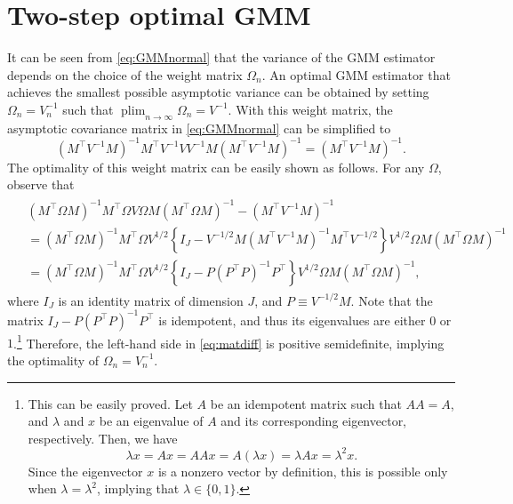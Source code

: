\documentclass[10.5pt, A4paper, openany, uplatex]{book}
\DeclareMathOperator*{\plim}{plim}
\numberwithin{equation}{section}
\begin{document}
\section{Two-step optimal GMM}
It can be seen from \eqref{eq:GMMnormal} that the variance of the GMM estimator depends on the choice of the weight matrix $\Omega_n$.
An optimal GMM estimator that achieves the smallest possible asymptotic variance can be obtained by setting $\Omega_n = V_n^{-1}$ such that $\plim_{n \to \infty} \Omega_n = V^{-1}$.
With this weight matrix, the asymptotic covariance matrix in \eqref{eq:GMMnormal} can be simplified to
\[
	(M^\top V^{-1} M )^{-1} M^\top V^{-1} V V^{-1} M ( M^\top V^{-1} M )^{-1} =  (M^\top V^{-1} M )^{-1}.
\]
The optimality of this weight matrix can be easily shown as follows.
For any $\Omega$, observe that
\begin{align}\label{eq:matdiff}
\begin{split}
	&  (M^\top \Omega M )^{-1} M^\top \Omega V \Omega M ( M^\top \Omega M )^{-1}   - (M^\top V^{-1} M )^{-1} \\
	& =  (M^\top \Omega M )^{-1} M^\top \Omega V^{1/2}\left\{ I_J -  V^{-1/2}M ( M^\top V^{-1} M )^{-1} M^\top V^{-1/2} \right\} V^{1/2} \Omega M  (M^\top \Omega M )^{-1} \\
	& =   (M^\top \Omega M )^{-1} M^\top \Omega V^{1/2} \left\{ I_J - P (P^\top P)^{-1} P^\top \right\}  V^{1/2} \Omega M  (M^\top \Omega M )^{-1},
\end{split}
\end{align}
where $I_J$ is an identity matrix of dimension $J$, and $P \equiv V^{-1/2}M$.
Note that the matrix $ I_J - P (P^\top P)^{-1} P^\top$ is idempotent, and thus its eigenvalues are either $0$ or $1$.\footnote{\label{foot:idempotent}
	This can be easily proved.
	Let $A$ be an idempotent matrix such that $AA = A$, and $\lambda$ and $x$ be an eigenvalue of $A$ and its corresponding eigenvector, respectively.
	Then, we have
	\[
	\lambda x = Ax = AAx = A(\lambda x) = \lambda Ax = \lambda^2 x.
	\]
	Since the eigenvector $x$ is a nonzero vector by definition, this is possible only when $\lambda = \lambda^2$, implying that $\lambda \in \{0,1\}$.
	}
Therefore, the left-hand side in \eqref{eq:matdiff} is positive semidefinite, implying the optimality of  $\Omega_n = V_n^{-1}$.
\end{document}

